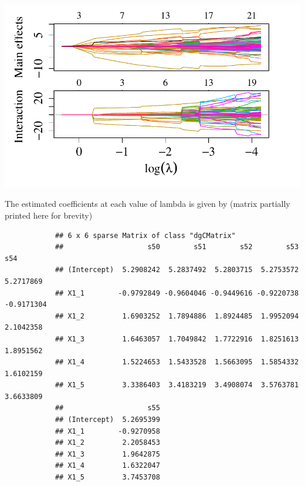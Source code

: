 			\begin{knitrout}\scriptsize
			\color{fgcolor}\begin{kframe}
			\begin{alltt}
			\end{alltt}
			\end{kframe}
			
			{\centering \includegraphics[width=1\linewidth]{figs/sail-solution-path-1} 
				
			}
			
			
			
			\end{knitrout}
			
			
			The estimated coefficients at each value of lambda is given by (matrix partially printed here for brevity)
			
			\begin{knitrout}\scriptsize
			\color{fgcolor}\begin{kframe}
			\begin{alltt}
			\hlstd{(fit)[}\hlopt{:}\hlstd{,}\hlopt{:}\hlstd{]}
			\end{alltt}
			\begin{verbatim}
			## 6 x 6 sparse Matrix of class "dgCMatrix"
			##                    s50        s51        s52        s53        s54
			## (Intercept)  5.2908242  5.2837492  5.2803715  5.2753572  5.2717869
			## X1_1        -0.9792849 -0.9604046 -0.9449616 -0.9220738 -0.9171304
			## X1_2         1.6903252  1.7894886  1.8924485  1.9952094  2.1042358
			## X1_3         1.6463057  1.7049842  1.7722916  1.8251613  1.8951562
			## X1_4         1.5224653  1.5433528  1.5663095  1.5854332  1.6102159
			## X1_5         3.3386403  3.4183219  3.4908074  3.5763781  3.6633809
			##                    s55
			## (Intercept)  5.2695399
			## X1_1        -0.9270958
			## X1_2         2.2058453
			## X1_3         1.9642875
			## X1_4         1.6322047
			## X1_5         3.7453708
			\end{verbatim}
			\end{kframe}
			\end{knitrout}
			
